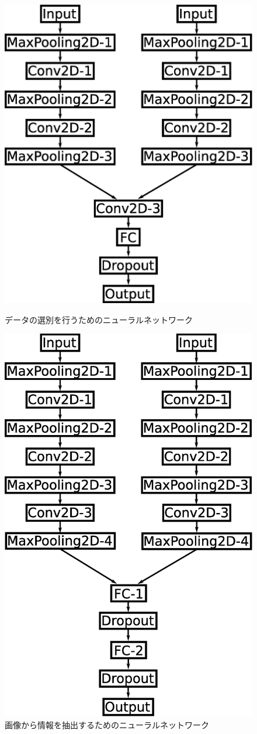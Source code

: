\documentclass{jps-cp}
\begin{document}
\begin{figure}
  \centering
  \begin{minipage}{0.45\columnwidth}
    \centering
    \includegraphics[clip, width=0.7\columnwidth]{eps/event_selection.eps}
    \caption{データの選別を行うためのニューラルネットワーク}
    \label{fig:selection}
  \end{minipage}
  \hfill
  \begin{minipage}{0.45\columnwidth}
    \centering
    \includegraphics[clip, width=0.7\columnwidth]{eps/point_detection.eps}
    \caption{画像から情報を抽出するためのニューラルネットワーク}
    \label{fig:extraction}
  \end{minipage}
\end{figure}
\end{document}
